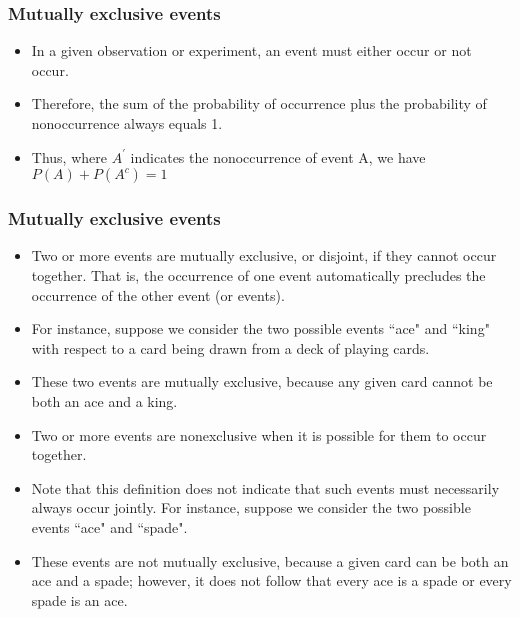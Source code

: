 \documentclass{beamer}
\begin{document}
\begin{frame} 
\frametitle{Mutually exclusive events}
\Large
\begin{itemize}
\item In a given observation or experiment, an event must either occur or not occur. \item Therefore, the sum of the
probability of occurrence plus the probability of nonoccurrence always equals 1. \item Thus, where $A^{\prime}$ indicates the nonoccurrence of event A, we have
$P(A) + P(A^{c}) =  1$
\end{itemize}
\end{frame}
\begin{frame} 
\frametitle{Mutually exclusive events}
\Large
\begin{itemize}
\item 
Two or more events are mutually exclusive, or disjoint, if they cannot occur together. That is, the occurrence
of one event automatically precludes the occurrence of the other event (or events). 
\item For instance, suppose we
consider the two possible events ``ace" and ``king" with respect to a card being drawn from a deck of playing
cards. 
\item These two events are mutually exclusive, because any given card cannot be both an ace and a king.
\item Two or more events are nonexclusive when it is possible for them to occur together.
\end{itemize} 
\end{frame}
\begin{frame} 
\Large
\begin{itemize}
\item Note that this definition does not indicate that such events must necessarily always occur jointly. For instance, suppose we consider the two possible events ``ace" and ``spade". 
\item These events are not mutually exclusive, because a given card can be both an ace and a spade; however, it does not follow that every ace is a spade or every spade is an ace.
\end{itemize}
\end{frame}
\end{document}
